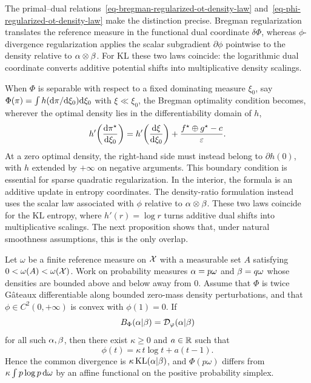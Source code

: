 The primal--dual relations~\eqref{eq-bregman-regularized-ot-density-law} and~\eqref{eq-phi-regularized-ot-density-law} make the distinction precise. Bregman regularization translates the reference measure in the functional dual coordinate $\delta\Phi$, whereas $\phi$-divergence regularization applies the scalar subgradient $\partial\phi$ pointwise to the density relative to $\alpha\otimes\beta$. For KL these two laws coincide: the logarithmic dual coordinate converts additive potential shifts into multiplicative density scalings.

When $\Phi$ is separable with respect to a fixed dominating measure $\xi_0$, say $\Phi(\pi)=\int h(\mathrm{d}\pi/\mathrm{d}\xi_0)\mathrm{d}\xi_0$ with $\xi\ll\xi_0$, the Bregman optimality condition becomes, wherever the optimal density lies in the differentiability domain of $h$,
\[
	h'\!\left(\frac{\mathrm{d}\pi^\star}{\mathrm{d}\xi_0}\right)
	=
	h'\!\left(\frac{\mathrm{d}\xi}{\mathrm{d}\xi_0}\right)
	+
	\frac{f^\star\oplus g^\star-c}{\varepsilon}.
\]
At a zero optimal density, the right-hand side must instead belong to $\partial h(0)$, with $h$ extended by $+\infty$ on negative arguments. This boundary condition is essential for sparse quadratic regularization. In the interior, the formula is an additive update in entropy coordinates. The density-ratio formulation instead uses the scalar law associated with $\phi$ relative to $\alpha\otimes\beta$. These two laws coincide for the KL entropy, where $h'(r)=\log r$ turns additive dual shifts into multiplicative scalings. The next proposition shows that, under natural smoothness assumptions, this is the only overlap.

\begin{prop}\label{prop-kl-only-bregman-phi}
	Let $\omega$ be a finite reference measure on $\mathcal{X}$ with a measurable set $A$ satisfying $0<\omega(A)<\omega(\mathcal{X})$. Work on probability measures $\alpha=p\omega$ and $\beta=q\omega$ whose densities are bounded above and below away from $0$. Assume that $\Phi$ is twice G\^ateaux differentiable along bounded zero-mass density perturbations, and that $\phi\in C^2(0,+\infty)$ is convex with $\phi(1)=0$. If
	\[
		B_\Phi(\alpha|\beta)=\mathcal{D}_\varphi(\alpha|\beta)
	\]
	for all such $\alpha,\beta$, then there exist $\kappa\geq0$ and $a\in\mathbb{R}$ such that
	\[
		\phi(t)=\kappa\,t\log t+a(t-1).
	\]
	Hence the common divergence is $\kappa\operatorname{KL}(\alpha|\beta)$, and $\Phi(p\omega)$ differs from $\kappa\int p\log p\,\mathrm{d}\omega$ by an affine functional on the positive probability simplex.
\end{prop}

